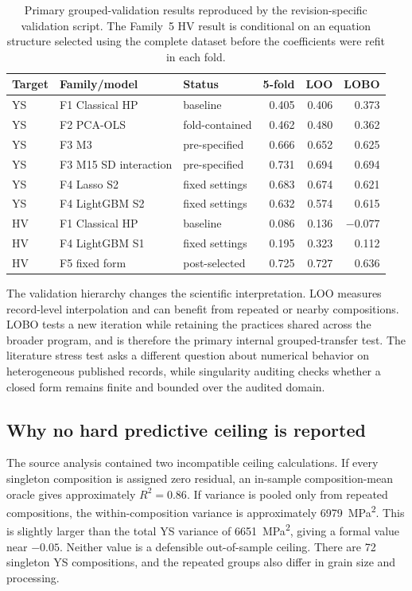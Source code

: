 \documentclass[a4paper,11pt]{article}
\begin{document}
\begin{table}[H]
\centering
\caption{Primary grouped-validation results reproduced by the revision-specific validation script. The Family~5 HV result is conditional on an equation structure selected using the complete dataset before the coefficients were refit in each fold.}
\label{tab:grouped}
\small
\setlength{\tabcolsep}{4pt}
\begin{tabular}{lllrrr}
\toprule
Target & Family/model & Status & 5-fold & LOO & LOBO \\
\midrule
YS & F1 Classical HP & baseline & 0.405 & 0.406 & 0.373 \\
YS & F2 PCA-OLS & fold-contained & 0.462 & 0.480 & 0.362 \\
YS & F3 M3 & pre-specified & 0.666 & 0.652 & 0.625 \\
YS & F3 M15 SD interaction & pre-specified & 0.731 & 0.694 & 0.694 \\
YS & F4 Lasso S2 & fixed settings & 0.683 & 0.674 & 0.621 \\
YS & F4 LightGBM S2 & fixed settings & 0.632 & 0.574 & 0.615 \\
HV & F1 Classical HP & baseline & 0.086 & 0.136 & $-0.077$ \\
HV & F4 LightGBM S1 & fixed settings & 0.195 & 0.323 & 0.112 \\
HV & F5 fixed form & post-selected & 0.725 & 0.727 & 0.636 \\
\bottomrule
\end{tabular}
\end{table}

The validation hierarchy changes the scientific interpretation. LOO measures record-level interpolation and can benefit from repeated or nearby compositions. LOBO tests a new iteration while retaining the practices shared across the broader program, and is therefore the primary internal grouped-transfer test. The literature stress test asks a different question about numerical behavior on heterogeneous published records, while singularity auditing checks whether a closed form remains finite and bounded over the audited domain.

\subsection{Why no hard predictive ceiling is reported}

The source analysis contained two incompatible ceiling calculations. If every singleton composition is assigned zero residual, an in-sample composition-mean oracle gives approximately $R^2=0.86$. If variance is pooled only from repeated compositions, the within-composition variance is approximately \SI{6979}{MPa^2}. This is slightly larger than the total YS variance of \SI{6651}{MPa^2}, giving a formal value near $-0.05$. Neither value is a defensible out-of-sample ceiling. There are 72 singleton YS compositions, and the repeated groups also differ in grain size and processing.
\end{document}
